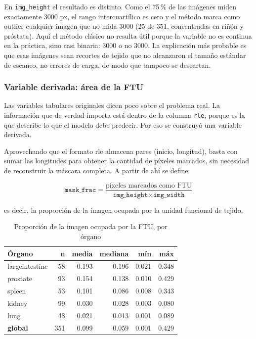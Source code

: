 \documentclass[11pt,letterpaper]{article}
\begin{document}
En \texttt{img\_height} el resultado es distinto. Como el 75\,\% de las imágenes miden exactamente
3000 px, el rango intercuartílico es cero y el método marca como outlier cualquier imagen que no
mida 3000 (25 de 351, concentradas en riñón y próstata). Aquí el método clásico no resulta útil
porque la variable no es continua en la práctica, sino casi binaria: 3000 o no 3000. La explicación
más probable es que esas imágenes sean recortes de tejido que no alcanzaron el tamaño estándar de
escaneo, no errores de carga, de modo que tampoco se descartan.

\subsubsection{Variable derivada: área de la FTU}

Las variables tabulares originales dicen poco sobre el problema real. La información que de verdad
importa está dentro de la columna \texttt{rle}, porque es la que describe lo que el modelo debe
predecir. Por eso se construyó una variable derivada.

Aprovechando que el formato rle almacena pares (inicio, longitud), basta con sumar las longitudes
para obtener la cantidad de píxeles marcados, sin necesidad de reconstruir la máscara completa. A
partir de ahí se define:

\begin{equation*}
\texttt{mask\_frac} = \frac{\text{píxeles marcados como FTU}}
                           {\texttt{img\_height} \times \texttt{img\_width}}
\end{equation*}

es decir, la proporción de la imagen ocupada por la unidad funcional de tejido.

\begin{table}[H]
\centering
\caption{Proporción de la imagen ocupada por la FTU, por órgano}\label{tab:maskfrac}
\begin{tabular}{lrrrrr}
\toprule
\textbf{Órgano} & \textbf{n} & \textbf{media} & \textbf{mediana} & \textbf{mín} & \textbf{máx} \\
\midrule
largeintestine & 58 & 0.193 & 0.196 & 0.021 & 0.348 \\
prostate       & 93 & 0.154 & 0.138 & 0.010 & 0.429 \\
spleen         & 53 & 0.101 & 0.086 & 0.008 & 0.343 \\
kidney         & 99 & 0.030 & 0.028 & 0.003 & 0.080 \\
lung           & 48 & 0.021 & 0.013 & 0.001 & 0.089 \\
\midrule
\textbf{global} & 351 & 0.099 & 0.059 & 0.001 & 0.429 \\
\bottomrule
\end{tabular}
\end{table}
\end{document}
